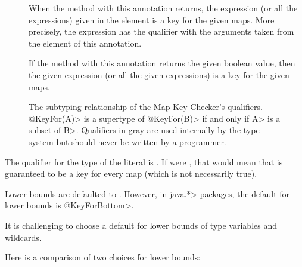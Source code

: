 \begin{description}
\item[]
  When the method with this annotation returns, the expression (or all the
  expressions) given in the  element is a key for the given
  maps. More precisely, the expression has the  qualifier
  with the  arguments taken from the  element
  of this annotation.
\item[]
  If the method with this annotation returns the given boolean value,
  then the given expression (or all the given expressions)
  is a key for the given maps.
\end{description}

\begin{figure}
\caption{The subtyping relationship of the Map Key Checker's qualifiers.
\<@KeyFor(A)> is a supertype of \<@KeyFor(B)> if and only if \<A> is a subset of
\<B>.  Qualifiers in gray are used internally by the type system but should
never be written by a programmer.}
\label{fig-map-key-keyfor-hierarchy}
\end{figure}


The qualifier for the type of the  literal is .
If  were , that would mean that
 is guaranteed to be a key for every map (which is not
necessarily true).


Lower bounds are defaulted to .
However, in \<java.*> packages, the default for lower bounds is
\<@KeyForBottom>.

It is challenging to choose a default for lower bounds of type variables
and wildcards.

Here is a comparison of two choices for lower bounds:

\medskip

